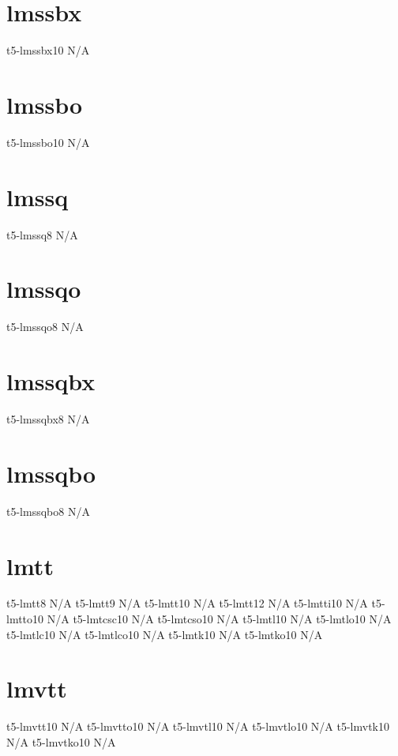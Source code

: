 \documentclass[sample]{vnsample}
\begin{document}
\section{lmssbx}
    {t5-lmssbx10}        {N/A}

\section{lmssbo}
   {t5-lmssbo10}        {N/A}

\section{lmssq}
    {t5-lmssq8}          {N/A}

\section{lmssqo}
   {t5-lmssqo8}         {N/A}

\section{lmssqbx}
   {t5-lmssqbx8}        {N/A}

\section{lmssqbo}
  {t5-lmssqbo8}        {N/A}

\section{lmtt}
     {t5-lmtt8}           {N/A}
     {t5-lmtt9}           {N/A}
     {t5-lmtt10}          {N/A}
     {t5-lmtt12}          {N/A}
    {t5-lmtti10}         {N/A}
    {t5-lmtto10}         {N/A}
    {t5-lmtcsc10}        {N/A}
  {t5-lmtcso10}        {N/A}
    {t5-lmtl10}          {N/A}
   {t5-lmtlo10}         {N/A}
    {t5-lmtlc10}         {N/A}
   {t5-lmtlco10}        {N/A}
    {t5-lmtk10}          {N/A}
   {t5-lmtko10}         {N/A}

\section{lmvtt}
    {t5-lmvtt10}         {N/A}
   {t5-lmvtto10}        {N/A}
   {t5-lmvtl10}         {N/A}
  {t5-lmvtlo10}        {N/A}
   {t5-lmvtk10}         {N/A}
  {t5-lmvtko10}        {N/A}
\end{document}
